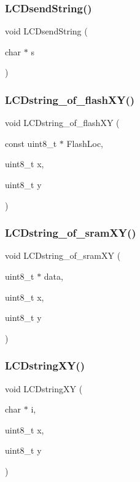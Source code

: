 \mbox{\label{lcd_8c_af5a8f51b917f3ccae2694c68de881968}} 
\subsubsection{L\+C\+Dsend\+String()}
{\footnotesize\ttfamily void L\+C\+Dsend\+String (\begin{DoxyParamCaption}\item[{char $\ast$}]{s }\end{DoxyParamCaption})}

\mbox{\label{lcd_8c_a5898889259f827a95d99f11628b55882}} 
\subsubsection{L\+C\+Dstring\+\_\+of\+\_\+flash\+X\+Y()}
{\footnotesize\ttfamily void L\+C\+Dstring\+\_\+of\+\_\+flash\+XY (\begin{DoxyParamCaption}\item[{const uint8\+\_\+t $\ast$}]{Flash\+Loc,  }\item[{uint8\+\_\+t}]{x,  }\item[{uint8\+\_\+t}]{y }\end{DoxyParamCaption})}

\mbox{\label{lcd_8c_ace25a462b6c0a339c3942c54d04d1101}} 
\subsubsection{L\+C\+Dstring\+\_\+of\+\_\+sram\+X\+Y()}
{\footnotesize\ttfamily void L\+C\+Dstring\+\_\+of\+\_\+sram\+XY (\begin{DoxyParamCaption}\item[{uint8\+\_\+t $\ast$}]{data,  }\item[{uint8\+\_\+t}]{x,  }\item[{uint8\+\_\+t}]{y }\end{DoxyParamCaption})}

\mbox{\label{lcd_8c_a490b5c8b4fe10588e2aeb05612b0bc2b}} 
\subsubsection{L\+C\+Dstring\+X\+Y()}
{\footnotesize\ttfamily void L\+C\+Dstring\+XY (\begin{DoxyParamCaption}\item[{char $\ast$}]{i,  }\item[{uint8\+\_\+t}]{x,  }\item[{uint8\+\_\+t}]{y }\end{DoxyParamCaption})}

